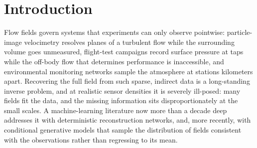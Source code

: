 \documentclass[aip,pof,reprint,amsmath,amssymb,superscriptaddress]{revtex4-1}
\begin{document}
\maketitle

\section{Introduction}\label{sec:intro}

Flow fields govern systems that experiments can only observe pointwise:
particle-image velocimetry resolves planes of a turbulent flow while the
surrounding volume goes unmeasured, flight-test campaigns record surface pressure
at taps while the off-body flow that determines performance is inaccessible, and
environmental monitoring networks sample the atmosphere at stations kilometers
apart. Recovering the full field from such sparse, indirect data is a
long-standing inverse problem,\cite{callaham2019robust,raissi2020hidden,vinuesa2023transformative}
and at realistic sensor densities it is severely ill-posed: many fields fit the
data, and the missing information sits disproportionately at the small scales.
A machine-learning literature now more than a decade deep addresses it with
deterministic reconstruction networks,\cite{fukami2021global,santos2023senseiver,erichson2020shallow,dang2025flronet}
and, more recently, with conditional generative models that sample the
distribution of fields consistent with the observations rather than regressing
to its mean.\cite{shu2023physics,li2024s3gm,huang2024diffusionpde,du2024confild,oommen2026turbulent,zhuang2025spatially}
\end{document}
